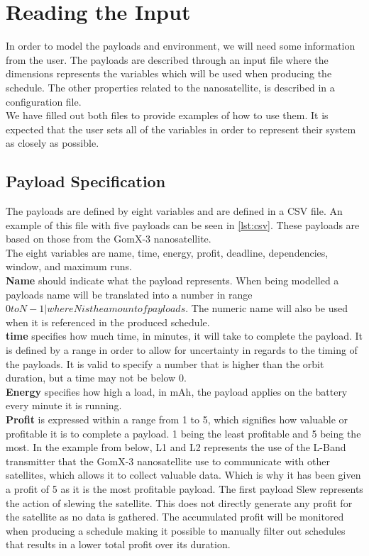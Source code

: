 \section{Reading the Input} \label{sec:read_input}
In order to model the payloads and environment, we will need some information from the user. The payloads are described through an input file where the dimensions represents the variables which will be used when producing the schedule. The other properties related to the nanosatellite, is described in a configuration file.\\
We have filled out both files to provide examples of how to use them. It is expected that the user sets all of the variables in order to represent their system as closely as possible.

\subsection{Payload Specification} \label{subsec:csv}
The payloads are defined by eight variables and are defined in a CSV file. An example of this file with five payloads can be seen in \cref{lst:csv}. These payloads are based on those from the GomX-3 nanosatellite\cite{gomx3}.\\
The eight variables are name, time, energy, profit, deadline, dependencies, window, and maximum runs.\\
\textbf{Name} should indicate what the payload represents. When being modelled a payloads name will be translated into a number in range $0 to N-1 | where N is the amount of payloads$. The numeric name will also be used when it is referenced in the produced schedule.\\
\textbf{time} specifies how much time, in minutes, it will take to complete the payload. It is defined by a range in order to allow for uncertainty in regards to the timing of the payloads. It is valid to specify a number that is higher than the orbit duration, but a time may not be below 0.\\
\textbf{Energy} specifies how high a load, in mAh, the payload applies on the battery every minute it is running.\\
\textbf{Profit} is expressed within a range from 1 to 5, which signifies how valuable or profitable it is to complete a payload. 1 being the least profitable and 5 being the most.
In the example from below, L1 and L2 represents the use of the L-Band transmitter that the GomX-3 nanosatellite use to communicate with other satellites, which allows it to collect valuable data. Which is why it has been given a profit of 5 as it is the most profitable payload. The first payload Slew represents the action of slewing the satellite. This does not directly generate any profit for the satellite as no data is gathered. The accumulated profit will be monitored when producing a schedule making it possible to manually filter out schedules that results in a lower total profit over its duration.\\
